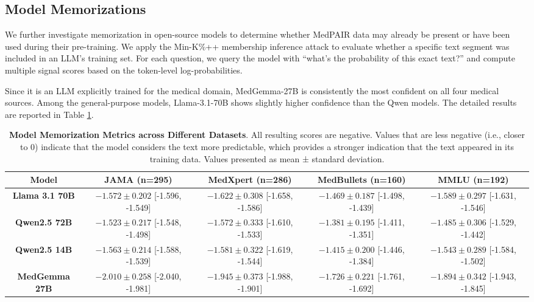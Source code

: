 \documentclass[11pt]{article}
\begin{document}
\subsection{Model Memorizations}

We further investigate memorization in open-source models to determine whether MedPAIR data may already be present or have been used during their pre-training. We apply the Min-K\%++ membership inference attack \cite{zhang2024min} to evaluate whether a specific text segment was included in an LLM’s training set. For each question, we query the model with “what’s the probability of this exact text?” and compute multiple signal scores based on the token-level log-probabilities. 

Since it is an LLM explicitly trained for the medical domain, MedGemma-27B is consistently the most confident on all four medical sources. Among the general-purpose models, Llama-3.1-70B shows slightly higher confidence than the Qwen models. The detailed results are reported in Table \ref{model_memorization}.

\begin{table}[h!]
  \centering
  {\scriptsize
  \begin{tabular}{c|c|c|c|c} 
    \toprule
    \textbf{Model} & \textbf{JAMA} (n=295) & \textbf{MedXpert} (n=286) & \textbf{MedBullets} (n=160) & \textbf{MMLU} (n=192)\\
    \midrule
    \textbf{Llama 3.1 70B}    & $-1.572 \pm 0.202$ {\tiny[-1.596, -1.549]} & $-1.622 \pm 0.308$ {\tiny[-1.658, -1.586]} & $-1.469 \pm 0.187$ {\tiny[-1.498, -1.439]} & $-1.589 \pm 0.297$ {\tiny[-1.631, -1.546]}\\
    \textbf{Qwen2.5 72B}      & $-1.523 \pm 0.217$ {\tiny[-1.548, -1.498]} & $-1.572 \pm 0.333$ {\tiny[-1.610, -1.533]} & $-1.381 \pm 0.195$ {\tiny[-1.411, -1.351]} & $-1.485 \pm 0.306$ {\tiny[-1.529, -1.442]}\\
    \textbf{Qwen2.5 14B}      & $-1.563 \pm 0.214$ {\tiny[-1.588, -1.539]} & $-1.581 \pm 0.322$ {\tiny[-1.619, -1.544]} & $-1.415 \pm 0.200$ {\tiny[-1.446, -1.384]} & $-1.543 \pm 0.289$ {\tiny[-1.584, -1.502]}\\
    \textbf{MedGemma 27B}     & $-2.010 \pm 0.258$ {\tiny[-2.040, -1.981]} & $-1.945 \pm 0.373$ {\tiny[-1.988, -1.901]} & $-1.726 \pm 0.221$ {\tiny[-1.761, -1.692]} & $-1.894 \pm 0.342$ {\tiny[-1.943, -1.845]}\\
    \bottomrule
  \end{tabular}
  }
  \caption{\textbf{Model Memorization Metrics across Different Datasets}. All resulting scores are negative. Values that are less negative (i.e., closer to 0) indicate that the model considers the text more predictable, which provides a stronger indication that the text appeared in its training data. Values presented as mean ± standard deviation.}
  \label{model_memorization}
\end{table}
\end{document}
